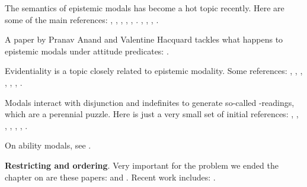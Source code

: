 The semantics of epistemic modals has become a hot topic recently. Here are some
of the main references: \cite{hacking-1967-possibility},
\cite{teller-1972-epistemic}, \cite{derose-1991-epistemic},
\cite{egan-hawthorne-weatherson-2005-epistemic}, \cite{egan-2007-epistemic},
\cite{macfarlane-2011-EpistemicModalsAreAssessment}.
\cite{stephenson-2007-judge-lp},
\cite{hawthorne-2007-EavesdroppersEpistemicModals},
\cite{fintel-gillies-2008-cia-leaks}, \cite{fintel-gillies-2011-MightMadeRight}.

A paper by Pranav Anand and Valentine Hacquard tackles what happens to epistemic
modals under attitude predicates:
\cite{anand-hacquard-2013-epistemics-attitudes}.

Evidentiality is a topic closely related to epistemic modality. Some references:
\cite{willett-1988-evidentials}, \cite{aikhenvald-2004-Evidentiality},
\cite{drubig-2001-epistemic}, \cite{blain-dechaine-2007-evidentials},
\cite{mccready-ogata-2007-evidentials}, \cite{speas-2008-evidentials},
\cite{fintel-gillies-2010-mss}.

Modals interact with disjunction and indefinites to generate so-called
-readings, which are a perennial puzzle. Here is just a very
small set of initial references: \cite{kamp-1973-freechoice},
\cite{zimmermann-2000-fc-disjunction}, \cite{schulz-2005-fcp-synthese},
\cite{aloni-2007-freechoice}, \cite{alonso-ovalle-2006-thesis},
\cite{fox-2007-freechoice}, \cite{rooij-2006-donkeys}.

On ability modals, see
\cite{hackl-1998-ability,mandelkern-schultheis-boylan-2017-AgentiveModals}.

\textbf{Restricting and ordering}. Very important for the problem we ended the
chapter on are these papers:
\cite{kaufmann-schwager-2009-conditional-imperatives} and
\cite{condoravdi-lauer-2016-anankastic}. Recent work includes:
\cite{blumberg-holguin-2019-EmbeddedAttitudes,fintel-pasternak-2022-AttitudesAboutness}.


